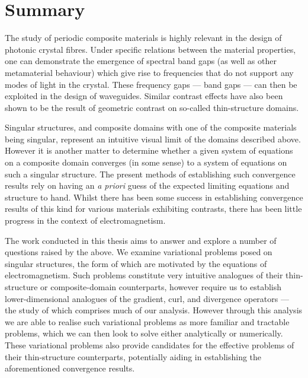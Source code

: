 \chapter*{Summary}
The study of periodic composite materials is highly relevant in the design of photonic crystal fibres.
Under specific relations between the material properties, one can demonstrate the emergence of spectral band gaps (as well as other metamaterial behaviour) which give rise to frequencies that do not support any modes of light in the crystal.
These frequency gaps --- band gaps --- can then be exploited in the design of waveguides.
Similar contrast effects have also been shown to be the result of geometric contrast on so-called thin-structure domains.

Singular structures, and composite domains with one of the composite materials being singular, represent an intuitive visual limit of the domains described above.
However it is another matter to determine whether a given system of equations on a composite domain converges (in some sense) to a system of equations on such a singular structure.
The present methods of establishing such convergence results rely on having an \emph{a priori} guess of the expected limiting equations and structure to hand.
Whilst there has been some success in establishing convergence results of this kind for various materials exhibiting contrasts, there has been little progress in the context of electromagnetism.

The work conducted in this thesis aims to answer and explore a number of questions raised by the above.
We examine variational problems posed on singular structures, the form of which are motivated by the equations of electromagnetism.
Such problems constitute very intuitive analogues of their thin-structure or composite-domain counterparts, however require us to establish lower-dimensional analogues of the gradient, curl, and divergence operators --- the study of which comprises much of our analysis.
However through this analysis we are able to realise such variational problems as more familiar and tractable problems, which we can then look to solve either analytically or numerically.
These variational problems also provide candidates for the effective problems of their thin-structure counterparts, potentially aiding in establishing the aforementioned convergence results.  

